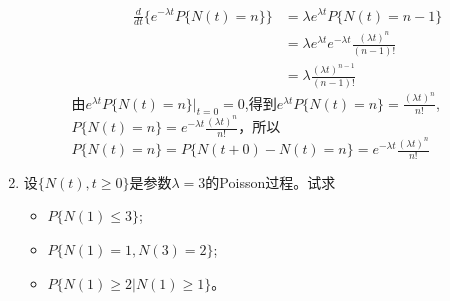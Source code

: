 \begin{enumerate}
\begin{enumerate}[\bfseries 1)]
\begin{itemize}
			                  \begin{align*}
				                  \frac{d}{dt}\{e^{-\lambda t}P\{N(t)=n\}\}
				                   & =\lambda e^{\lambda t}P\{N(t)=n-1\}                              \\
				                   & =\lambda e^{\lambda t}e^{-\lambda t}\frac{(\lambda t)^n}{(n-1)!} \\
				                   & =\lambda \frac{(\lambda t)^{n-1}}{(n-1)!}
			                  \end{align*}
			                  由\(e^{\lambda t}P\{N(t)=n\}|_{t=0}=0\),得到\(e^{\lambda t}P\{N(t)=n\}=\frac{(\lambda t)^n}{n!}\),\(P\{N(t)=n\}=e^{-\lambda t}\frac{(\lambda t)^n}{n!}\)，所以\(P\{N(t)=n\}=P\{N(t+0)-N(t)=n\}=e^{-\lambda t}\frac{(\lambda t)^n}{n!}\)
		            \end{itemize}

	      \end{enumerate}
	\item 设\(\{N(t),t\geqslant0\}\)是参数\(\lambda=3\)的Poisson过程。试求
	      \begin{itemize}[\bfseries 1)]
		      \item \(P\{N(1)\leqslant3\}\);
		      \item \(P\{N(1)=1,N(3)=2\}\);
		      \item \(P\{N(1)\geqslant2|N(1)\geqslant1\}\)。
	      \end{itemize}


\end{enumerate}
